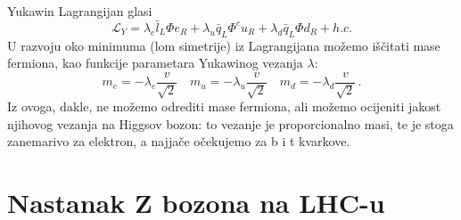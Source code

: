 \documentclass[a4paper,12pt]{report}
\begin{document}
Yukawin Lagrangijan glasi $$\mathcal{L}_{Y}=\lambda_{e}\bar{l}_{L}\Phi e_{R}+\lambda_{u}\bar{q}_{L}\Phi^{c} u_{R}+\lambda_{d}\bar{q}_{L}\Phi d_{R}+ h.c.$$ U razvoju oko minimuma (lom simetrije) iz Lagrangijana možemo iščitati mase fermiona, kao funkcije parametara Yukawinog vezanja $\lambda$: $$m_{e}=-\lambda_{e}\frac{v}{\sqrt{2}}\quad m_{u}=-\lambda_{u}\frac{v}{\sqrt{2}}\quad m_{d}=-\lambda_{d}\frac{v}{\sqrt{2}}\,.$$ Iz ovoga, dakle, ne možemo odrediti mase fermiona, ali možemo ocijeniti jakost njihovog vezanja na Higgsov bozon: to vezanje je proporcionalno masi, te je stoga zanemarivo za elektron, a najjače očekujemo za b i t kvarkove.

\section{Nastanak Z bozona na LHC-u}
\end{document}
